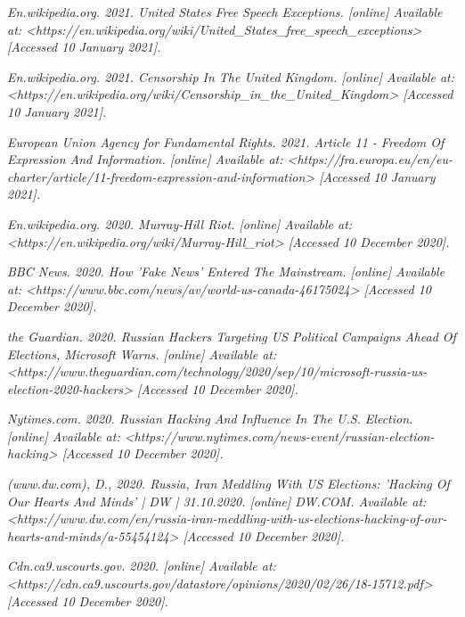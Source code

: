 \documentclass[openany]{article}
\begin{document}
	\pagebreak
		\begin{thebibliography}{1}	
			\textit{En.wikipedia.org. 2021. United States Free Speech Exceptions. [online] Available at: <https://en.wikipedia.org/wiki/United\_States\_free\_speech\_exceptions> [Accessed 10 January 2021].}

			\textit{En.wikipedia.org. 2021. Censorship In The United Kingdom. [online] Available at: <https://en.wikipedia.org/wiki/Censorship\_in\_the\_United\_Kingdom> [Accessed 10 January 2021].}
			
			\textit{European Union Agency for Fundamental Rights. 2021. Article 11 - Freedom Of Expression And Information. [online] Available at: <https://fra.europa.eu/en/eu-charter/article/11-freedom-expression-and-information> [Accessed 10 January 2021].}
			

			\textit{En.wikipedia.org. 2020. Murray-Hill Riot. [online] Available at: <https://en.wikipedia.org/wiki/Murray-Hill\_riot> [Accessed 10 December 2020].}
			
			\textit{BBC News. 2020. How 'Fake News' Entered The Mainstream. [online] Available at: <https://www.bbc.com/news/av/world-us-canada-46175024> [Accessed 10 December 2020].}
			
			
			\textit{the Guardian. 2020. Russian Hackers Targeting US Political Campaigns Ahead Of Elections, Microsoft Warns. [online] Available at: <https://www.theguardian.com/technology/2020/sep/10/microsoft-russia-us-election-2020-hackers> [Accessed 10 December 2020].}
			
			\textit{Nytimes.com. 2020. Russian Hacking And Influence In The U.S. Election. [online] Available at: <https://www.nytimes.com/news-event/russian-election-hacking> [Accessed 10 December 2020].}
			
			\textit{(www.dw.com), D., 2020. Russia, Iran Meddling With US Elections: 'Hacking Of Our Hearts And Minds' | DW | 31.10.2020. [online] DW.COM. Available at: <https://www.dw.com/en/russia-iran-meddling-with-us-elections-hacking-of-our-hearts-and-minds/a-55454124> [Accessed 10 December 2020].}
			
			\textit{Cdn.ca9.uscourts.gov. 2020. [online] Available at: <https://cdn.ca9.uscourts.gov/datastore/opinions/2020/02/26/18-15712.pdf> [Accessed 10 December 2020].}
			

\end{thebibliography}
\end{document}
